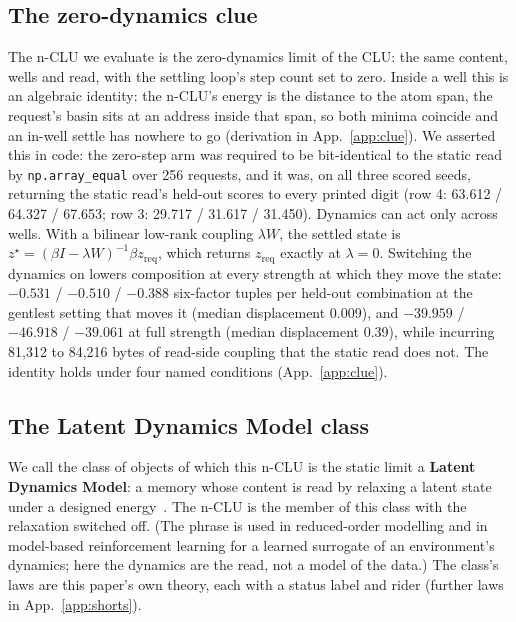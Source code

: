 \documentclass{article} %
\begin{document}
\subsection{The zero-dynamics clue}
\label{sec:clue}

The n-CLU we evaluate is the zero-dynamics limit of the CLU: the same content, wells and read,
with the settling loop's step count set to zero. Inside a well this is an algebraic identity: the n-CLU's energy is the distance to the atom span, the request's basin sits at an address inside that span, so both minima coincide and an in-well settle has nowhere
to go (derivation in App.~\ref{app:clue}). We asserted this in code: the zero-step arm was required to be bit-identical to
the static read by \texttt{np.array\_equal} over 256 requests, and it was, on all three scored
seeds, returning the static read's held-out scores to every printed digit (row 4: 63.612 /
64.327 / 67.653; row 3: 29.717 / 31.617 / 31.450). %
Dynamics can act only across wells. With a bilinear low-rank coupling $\lambda W$, the settled
state is $z^\star=(\beta I-\lambda W)^{-1}\beta z_{\text{req}}$, which returns
$z_{\text{req}}$ exactly at $\lambda=0$. Switching the dynamics on lowers composition at every
strength at which they move the state: $-0.531$ / $-0.510$ / $-0.388$ six-factor tuples per
held-out combination at the gentlest setting that moves it (median displacement 0.009), and $-39.959$ /
$-46.918$ / $-39.061$ at full strength (median displacement 0.39), while incurring 81,312 to 84,216 bytes of read-side coupling that the static read does not. %
The identity holds under four named conditions (App.~\ref{app:clue}).

\subsection{The Latent Dynamics Model class}
\label{sec:theory}

We call the class of objects of which this n-CLU is the static limit a \textbf{Latent Dynamics
Model}: a memory whose content is read by relaxing a latent state under a designed energy~\citep{hopfield_neural_1982,krotov_dense_2016,ramsauer_hopfield_2021,hoover_energy_2023,kong_reservoir-computing_2024}. The
n-CLU is the member of this class with the relaxation switched off. (The phrase is used in
reduced-order modelling and in model-based reinforcement learning for a learned surrogate of an
environment's dynamics; here the dynamics are the read, not a model of the data.) The class's laws are this paper's own theory, each with a status label and rider (further laws in
App.~\ref{app:shorts}).
\end{document}
